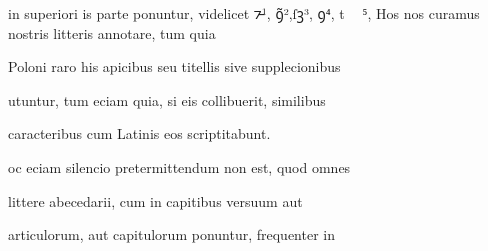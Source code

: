 






in superiori is parte ponuntur, videlicet ⁊̵¹, ꝯ̃²,ſꝫ³, ꝯ⁴, t  ⁵,  Hos 
nos curamus nostris litteris annotare, tum quia 

Poloni raro his apicibus seu titellis sive supplecionibus 

utuntur, tum eciam quia, si eis collibuerit, similibus 

caracteribus cum Latinis eos scriptitabunt. 

\indentP {}oc eciam silencio pretermittendum non est, quod omnes 

littere abecedarii, cum in capitibus versuum aut 

articulorum, aut capitulorum ponuntur, frequenter in 


